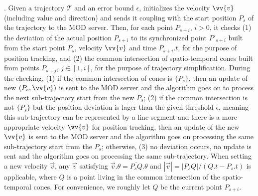 . Given a trajectory $\dddot{\mathcal{T}}$ and an error bound $\epsilon$, \citt initializes the velocity $\vv{v}$ (including value and direction) and sends it coupling with the start position $P_s$ of the trajectory to the MOD server. Then, for each point $P_{s+i}$, $i>0$, it checks (1) the deviation of the actual position $P_{s+i}$ to its synchronized point $P'_{s+i}$ built from the start point $P_s$, velocity $\vv{v}$ and time $P_{s+i}.t$, for the purpose of position tracking, and (2) the common intersection of spatio-temporal cones built from points $P_{s+j}$, $j \in [1, i]$, for the purpose of trajectory simplification.
%
During the checking, (1) if the common intersection of cones is $\{P_s\}$, then an update of new $(P_s, \vv{v})$ is sent to the MOD server and the algorithm goes on to process the next sub-trajectory start from the new $P_s$;
%
(2) if the common intersection is not $\{P_s\}$ but the position deviation is lager than the given threshold $\epsilon$, meaning this sub-trajectory can be represented by a line segment and there is a more appropriate velocity $\vv{v}$ for position tracking, then an update of the new $\vv{v}$ is sent to the MOD server and the algorithm goes on processing the same sub-trajectory start from the $P_s$;
%
otherwise, (3) no deviation occurs, no update is sent and the algorithm goes on processing the same sub-trajectory. 
%
When setting a new velocity $\vec{v}$, any $\vec{v}$ satisfying $\vec{v}.\theta = \overline{P_sQ}.\theta$ and $|\vec{v}|=|P_sQ|/(Q.t-P_s.t)$ is applicable, where $Q$ is a point living in the common intersection of the spatio-temporal cones. For convenience, we roughly let $Q$ be the current point $P_{s+i}$.


